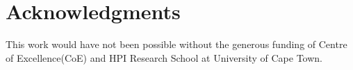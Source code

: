 \documentclass{sig-alternate}
\begin{document}


\section{Acknowledgments} 

This work would have
not been possible without the generous funding of Centre of Excellence(CoE)
and HPI Research School at University of Cape Town.

%

%
%
\end{document}
